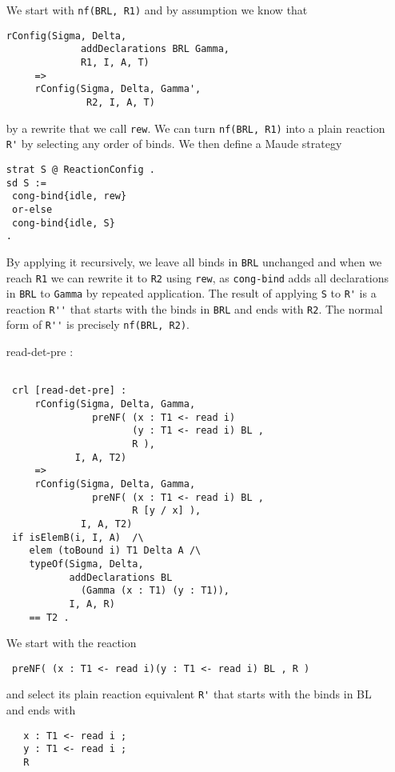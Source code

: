 \documentclass{article}
\begin{document}
\begin{itemize}
We start with \verb+nf(BRL, R1)+ and by assumption we know that
\begin{lstlisting} 
rConfig(Sigma, Delta, 
             addDeclarations BRL Gamma, 
             R1, I, A, T) 
     => 
     rConfig(Sigma, Delta, Gamma', 
              R2, I, A, T) 
  \end{lstlisting}              
by a rewrite that we call \verb+rew+.              
We can turn \verb+nf(BRL, R1)+ into a plain reaction \verb+R'+ 
by selecting any order of binds. 
We then define a Maude strategy 
\begin{lstlisting} 
strat S @ ReactionConfig .
sd S := 
 cong-bind{idle, rew}
 or-else
 cong-bind{idle, S}
.
  \end{lstlisting}
By applying it recursively, we leave all binds in \verb+BRL+ 
unchanged and when we reach
\verb+R1+ we can rewrite it to \verb+R2+ using \verb+rew+,
as \verb+cong-bind+ adds all declarations in \verb+BRL+ to
\verb+Gamma+ by repeated application. 
The result of applying \verb+S+ to \verb+R'+ is a reaction 
\verb+R''+ that starts with the binds in \verb+BRL+
and ends with \verb+R2+.
The normal form of \verb+R''+ is precisely 
\verb+nf(BRL, R2)+.  
 
\item[read-det-pre]:
\begin{lstlisting}     
     
 crl [read-det-pre] :
     rConfig(Sigma, Delta, Gamma, 
               preNF( (x : T1 <- read i)  
                      (y : T1 <- read i) BL , 
                      R ), 
            I, A, T2) 
     =>
     rConfig(Sigma, Delta, Gamma, 
               preNF( (x : T1 <- read i) BL , 
                      R [y / x] ), 
             I, A, T2) 
 if isElemB(i, I, A)  /\ 
    elem (toBound i) T1 Delta A /\
    typeOf(Sigma, Delta, 
           addDeclarations BL 
             (Gamma (x : T1) (y : T1)), 
           I, A, R) 
    == T2 .
   \end{lstlisting} 
   
We start with the reaction
\begin{lstlisting} 
 preNF( (x : T1 <- read i)(y : T1 <- read i) BL , R )
\end{lstlisting} 
and select its plain reaction equivalent \verb+R'+ 
that starts with the binds in BL
and ends with
 \begin{lstlisting}
   x : T1 <- read i ; 
   y : T1 <- read i ; 
   R
 \end{lstlisting} 


\end{itemize}
\end{document}
